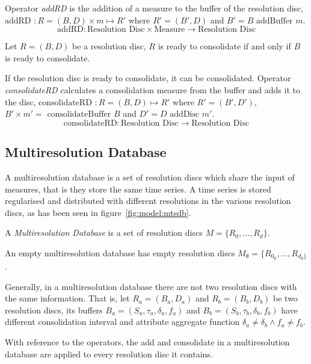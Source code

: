 Operator \emph{addRD} is the addition of a measure to the
buffer of the resolution disc, $\text{addRD } : R=(B,D) \times m \mapsto R'$ where
$R'= (B',D)$ and $B'= B \text{ addBuffer } m$.
\[
\text{addRD}: \text{Resolution Disc} \times \text{Measure}
\longrightarrow \text{Resolution Disc}
\]

Let $R=(B,D)$ be a resolution disc, $R$ is ready to consolidate if and
only if $B$ is ready to consolidate.

If the resolution disc is ready to consolidate, it can be
consolidated.  Operator \emph{consolidateRD} calculates a
consolidation measure from the buffer and adds it to the disc,
$\text{consolidateRD } : R=(B,D) \mapsto R'$ where $R'=
(B',D')$, $B' \times m'= \text{ consolidateBuffer } B $ and $ D'= D
\text{ addDisc } m'$.
\[
\text{consolidateRD}: \text{Resolution Disc} \longrightarrow
\text{Resolution Disc}
\]




\subsection{Multiresolution Database}\label{sec:model:rrd}

A multiresolution database is a set of resolution discs which
share the input of measures, that is they store the same time
series. A time series is stored regularised and distributed with
different resolutions in the various resolution discs, as has been seen
in figure~\ref{fig:model:mtsdb}.

\begin{definition}
  A \emph{Multiresolution Database} is a set of resolution discs
  $M=\{R_0,\dotsc,R_d\}$.
\end{definition}

An empty multiresolution database has empty resolution discs $M_{\emptyset}=\{R_{0_{\emptyset}},\dotsc,R_{d_{\emptyset}\}}$. 
 
Generally, in a multiresolution database there are not two resolution discs
with the same information. That is, let $R_a = (B_a, D_a)$ and $R_b =
(B_b, D_b)$ be two resolution discs, its buffers
$B_a=(S_a,\tau_a,\delta_a,f_a)$ and $B_b=(S_b,\tau_b,\delta_b,f_b)$
have different consolidation interval and attribute aggregate function
$\delta_a \neq \delta_b \wedge f_a \neq f_b$.


With reference to the operators, the add and consolidate in a
multiresolution database are applied to every resolution disc it
contains.


